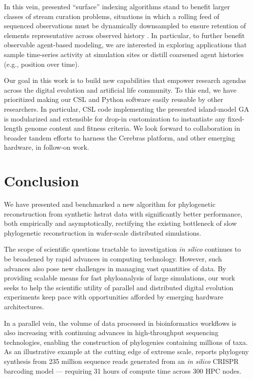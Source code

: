 In this vein, presented ``surface'' indexing algorithms stand to benefit larger classes of stream curation problems, situations in which a rolling feed of sequenced observations must be dynamically downsampled to ensure retention of elements representative across observed history \citep{moreno2024algorithms}.
In particular, to further benefit observable agent-based modeling, we are interested in exploring applications that sample time-series activity at simulation sites or distill coarsened agent histories (e.g., position over time).

Our goal in this work is to build new capabilities that empower research agendas across the digital evolution and artificial life community.
To this end, we have prioritized making our CSL and Python software easily reusable by other researchers.
In particular, CSL code implementing the presented island-model GA is modularized and extensible for drop-in customization to instantiate any fixed-length genome content and fitness criteria.
We look forward to collaboration in broader tandem efforts to harness the Cerebras platform, and other emerging hardware, in follow-on work.

\section{Conclusion} \label{sec:conclusion}

We have presented and benchmarked a new algorithm for phylogenetic reconstruction from synthetic hstrat \citep{moreno2024hstrat} data with significantly better performance, both empirically and asymptotically, rectifying the existing bottleneck of slow phylogenetic reconstruction in wafer-scale distributed simulations.

The scope of scientific questions tractable to investigation \textit{in silico} continues to be broadened by rapid advances in computing technology.
However, such advances also pose new challenges in managing vast quantities of data.
By providing scalable means for fast phyloanalysis of large simulations, our work seeks to help the scientific utility of parallel and distributed digital evolution experiments keep pace with opportunities afforded by emerging hardware architectures.

In a parallel vein, the volume of data processed in bioinformatics workflows is also increasing with continuing advances in high-throughput sequencing technologies, enabling the construction of phylogenies containing millions of taxa.
As an illustrative example at the cutting edge of extreme scale, \citet{konno2022deep} reports phylogeny synthesis from 235 million sequence reads generated from an \textit{in silico} CRISPR barcoding model --- requiring 31 hours of compute time across 300 HPC nodes.

